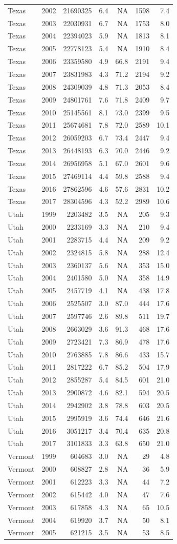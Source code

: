 \documentclass[
]{article}
\begin{document}
\begin{longtable}[]{@{}lrrrrrr@{}}
Texas & 2002 & 21690325 & 6.4 & NA & 1598 & 7.4\tabularnewline
Texas & 2003 & 22030931 & 6.7 & NA & 1753 & 8.0\tabularnewline
Texas & 2004 & 22394023 & 5.9 & NA & 1813 & 8.1\tabularnewline
Texas & 2005 & 22778123 & 5.4 & NA & 1910 & 8.4\tabularnewline
Texas & 2006 & 23359580 & 4.9 & 66.8 & 2191 & 9.4\tabularnewline
Texas & 2007 & 23831983 & 4.3 & 71.2 & 2194 & 9.2\tabularnewline
Texas & 2008 & 24309039 & 4.8 & 71.3 & 2053 & 8.4\tabularnewline
Texas & 2009 & 24801761 & 7.6 & 71.8 & 2409 & 9.7\tabularnewline
Texas & 2010 & 25145561 & 8.1 & 73.0 & 2399 & 9.5\tabularnewline
Texas & 2011 & 25674681 & 7.8 & 72.0 & 2589 & 10.1\tabularnewline
Texas & 2012 & 26059203 & 6.7 & 73.4 & 2447 & 9.4\tabularnewline
Texas & 2013 & 26448193 & 6.3 & 70.0 & 2446 & 9.2\tabularnewline
Texas & 2014 & 26956958 & 5.1 & 67.0 & 2601 & 9.6\tabularnewline
Texas & 2015 & 27469114 & 4.4 & 59.8 & 2588 & 9.4\tabularnewline
Texas & 2016 & 27862596 & 4.6 & 57.6 & 2831 & 10.2\tabularnewline
Texas & 2017 & 28304596 & 4.3 & 52.2 & 2989 & 10.6\tabularnewline
Utah & 1999 & 2203482 & 3.5 & NA & 205 & 9.3\tabularnewline
Utah & 2000 & 2233169 & 3.3 & NA & 210 & 9.4\tabularnewline
Utah & 2001 & 2283715 & 4.4 & NA & 209 & 9.2\tabularnewline
Utah & 2002 & 2324815 & 5.8 & NA & 288 & 12.4\tabularnewline
Utah & 2003 & 2360137 & 5.6 & NA & 353 & 15.0\tabularnewline
Utah & 2004 & 2401580 & 5.0 & NA & 358 & 14.9\tabularnewline
Utah & 2005 & 2457719 & 4.1 & NA & 438 & 17.8\tabularnewline
Utah & 2006 & 2525507 & 3.0 & 87.0 & 444 & 17.6\tabularnewline
Utah & 2007 & 2597746 & 2.6 & 89.8 & 511 & 19.7\tabularnewline
Utah & 2008 & 2663029 & 3.6 & 91.3 & 468 & 17.6\tabularnewline
Utah & 2009 & 2723421 & 7.3 & 86.9 & 478 & 17.6\tabularnewline
Utah & 2010 & 2763885 & 7.8 & 86.6 & 433 & 15.7\tabularnewline
Utah & 2011 & 2817222 & 6.7 & 85.2 & 504 & 17.9\tabularnewline
Utah & 2012 & 2855287 & 5.4 & 84.5 & 601 & 21.0\tabularnewline
Utah & 2013 & 2900872 & 4.6 & 82.1 & 594 & 20.5\tabularnewline
Utah & 2014 & 2942902 & 3.8 & 78.8 & 603 & 20.5\tabularnewline
Utah & 2015 & 2995919 & 3.6 & 74.4 & 646 & 21.6\tabularnewline
Utah & 2016 & 3051217 & 3.4 & 70.4 & 635 & 20.8\tabularnewline
Utah & 2017 & 3101833 & 3.3 & 63.8 & 650 & 21.0\tabularnewline
Vermont & 1999 & 604683 & 3.0 & NA & 29 & 4.8\tabularnewline
Vermont & 2000 & 608827 & 2.8 & NA & 36 & 5.9\tabularnewline
Vermont & 2001 & 612223 & 3.3 & NA & 44 & 7.2\tabularnewline
Vermont & 2002 & 615442 & 4.0 & NA & 47 & 7.6\tabularnewline
Vermont & 2003 & 617858 & 4.3 & NA & 65 & 10.5\tabularnewline
Vermont & 2004 & 619920 & 3.7 & NA & 50 & 8.1\tabularnewline
Vermont & 2005 & 621215 & 3.5 & NA & 53 & 8.5\tabularnewline

\end{longtable}
\end{document}
